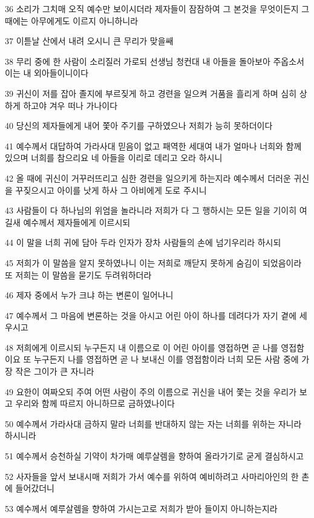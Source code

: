 \par 36 소리가 그치매 오직 예수만 보이시더라 제자들이 잠잠하여 그 본것을 무엇이든지 그 때에는 아무에게도 이르지 아니하니라
\par 37 이튿날 산에서 내려 오시니 큰 무리가 맞을쌔
\par 38 무리 중에 한 사람이 소리질러 가로되 선생님 청컨대 내 아들을 돌아보아 주옵소서 이는 내 외아들이니이다
\par 39 귀신이 저를 잡아 졸지에 부르짖게 하고 경련을 일으켜 거품을 흘리게 하며 심히 상하게 하고야 겨우 떠나 가나이다
\par 40 당신의 제자들에게 내어 쫓아 주기를 구하였으나 저희가 능히 못하더이다
\par 41 예수께서 대답하여 가라사대 믿음이 없고 패역한 세대여 내가 얼마나 너희와 함께 있으며 너희를 참으리요 네 아들을 이리로 데리고 오라 하시니
\par 42 올 때에 귀신이 거꾸러뜨리고 심한 경련을 일으키게 하는지라 예수께서 더러운 귀신을 꾸짖으시고 아이를 낫게 하사 그 아비에게 도로 주시니
\par 43 사람들이 다 하나님의 위엄을 놀라니라 저희가 다 그 행하시는 모든 일을 기이히 여길새 예수께서 제자들에게 이르시되
\par 44 이 말을 너희 귀에 담아 두라 인자가 장차 사람들의 손에 넘기우리라 하시되
\par 45 저희가 이 말씀을 알지 못하였나니 이는 저희로 깨닫지 못하게 숨김이 되었음이라 또 저희는 이 말씀을 묻기도 두려워하더라
\par 46 제자 중에서 누가 크냐 하는 변론이 일어나니
\par 47 예수께서 그 마음에 변론하는 것을 아시고 어린 아이 하나를 데려다가 자기 곁에 세우시고
\par 48 저희에게 이르시되 누구든지 내 이름으로 이 어린 아이를 영접하면 곧 나를 영접함이요 또 누구든지 나를 영접하면 곧 나 보내신 이를 영접함이라 너희 모든 사람 중에 가장 작은 그이가 큰 자니라
\par 49 요한이 여짜오되 주여 어떤 사람이 주의 이름으로 귀신을 내어 쫓는 것을 우리가 보고 우리와 함께 따르지 아니하므로 금하였나이다
\par 50 예수께서 가라사대 금하지 말라 너희를 반대하지 않는 자는 너희를 위하는 자니라 하시니라
\par 51 예수께서 승천하실 기약이 차가매 예루살렘을 향하여 올라가기로 굳게 결심하시고
\par 52 사자들을 앞서 보내시매 저희가 가서 예수를 위하여 예비하려고 사마리아인의 한 촌에 들어갔더니
\par 53 예수께서 예루살렘을 향하여 가시는고로 저희가 받아 들이지 아니하는지라
